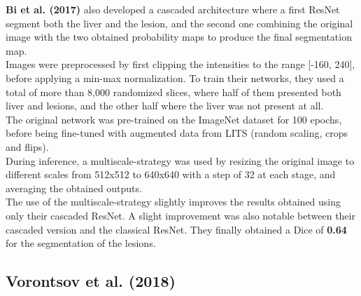 \textbf{Bi et al. (2017)} also developed a cascaded architecture where a
first ResNet segment both the liver and the lesion, and the second one
combining the original image with the two obtained probability maps to
produce the final segmentation map.\\
Images were preprocessed by first clipping the intensities to the range
{[}-160, 240{]}, before applying a min-max normalization. To train their
networks, they used a total of more than 8,000 randomized slices, where
half of them presented both liver and lesions, and the other half where
the liver was not present at all.\\
The original network was pre-trained on the ImageNet dataset for 100
epochs, before being fine-tuned with augmented data from LITS (random
scaling, crops and flips).\\
During inference, a multiscale-strategy was used by resizing the
original image to different scales from 512x512 to 640x640 with a step
of 32 at each stage, and averaging the obtained outputs.\\
The use of the multiscale-strategy slightly improves the results
obtained using only their cascaded ResNet. A slight improvement was also
notable between their cascaded version and the classical ResNet. They
finally obtained a Dice of \textbf{0.64} for the segmentation of the
lesions.

\subsection{Vorontsov et al. (2018)}\label{vorontsov-et-al.-2018}

